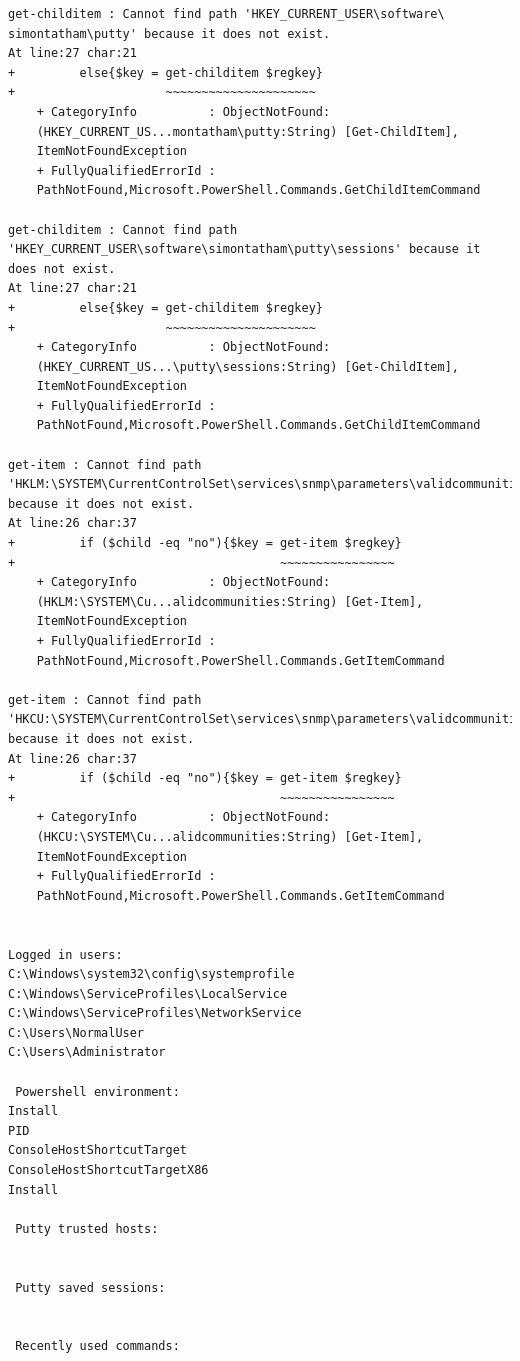 \documentclass{article}%
\begin{document}
\begin{verbatim}
get-childitem : Cannot find path 'HKEY_CURRENT_USER\software\
simontatham\putty' because it does not exist.
At line:27 char:21
+         else{$key = get-childitem $regkey}
+                     ~~~~~~~~~~~~~~~~~~~~~
    + CategoryInfo          : ObjectNotFound: 
    (HKEY_CURRENT_US...montatham\putty:String) [Get-ChildItem],
    ItemNotFoundException
    + FullyQualifiedErrorId :
    PathNotFound,Microsoft.PowerShell.Commands.GetChildItemCommand
 
get-childitem : Cannot find path
'HKEY_CURRENT_USER\software\simontatham\putty\sessions' because it 
does not exist.
At line:27 char:21
+         else{$key = get-childitem $regkey}
+                     ~~~~~~~~~~~~~~~~~~~~~
    + CategoryInfo          : ObjectNotFound:
    (HKEY_CURRENT_US...\putty\sessions:String) [Get-ChildItem], 
    ItemNotFoundException
    + FullyQualifiedErrorId :
    PathNotFound,Microsoft.PowerShell.Commands.GetChildItemCommand
 
get-item : Cannot find path
'HKLM:\SYSTEM\CurrentControlSet\services\snmp\parameters\validcommunities' 
because it does not exist.
At line:26 char:37
+         if ($child -eq "no"){$key = get-item $regkey}
+                                     ~~~~~~~~~~~~~~~~
    + CategoryInfo          : ObjectNotFound:
    (HKLM:\SYSTEM\Cu...alidcommunities:String) [Get-Item], 
    ItemNotFoundException
    + FullyQualifiedErrorId :
    PathNotFound,Microsoft.PowerShell.Commands.GetItemCommand
 
get-item : Cannot find path
'HKCU:\SYSTEM\CurrentControlSet\services\snmp\parameters\validcommunities' 
because it does not exist.
At line:26 char:37
+         if ($child -eq "no"){$key = get-item $regkey}
+                                     ~~~~~~~~~~~~~~~~
    + CategoryInfo          : ObjectNotFound:
    (HKCU:\SYSTEM\Cu...alidcommunities:String) [Get-Item], 
    ItemNotFoundException
    + FullyQualifiedErrorId :
    PathNotFound,Microsoft.PowerShell.Commands.GetItemCommand
 

Logged in users:
C:\Windows\system32\config\systemprofile
C:\Windows\ServiceProfiles\LocalService
C:\Windows\ServiceProfiles\NetworkService
C:\Users\NormalUser
C:\Users\Administrator

 Powershell environment:
Install
PID
ConsoleHostShortcutTarget
ConsoleHostShortcutTargetX86
Install

 Putty trusted hosts:


 Putty saved sessions:


 Recently used commands:



\end{verbatim}
\end{document}
